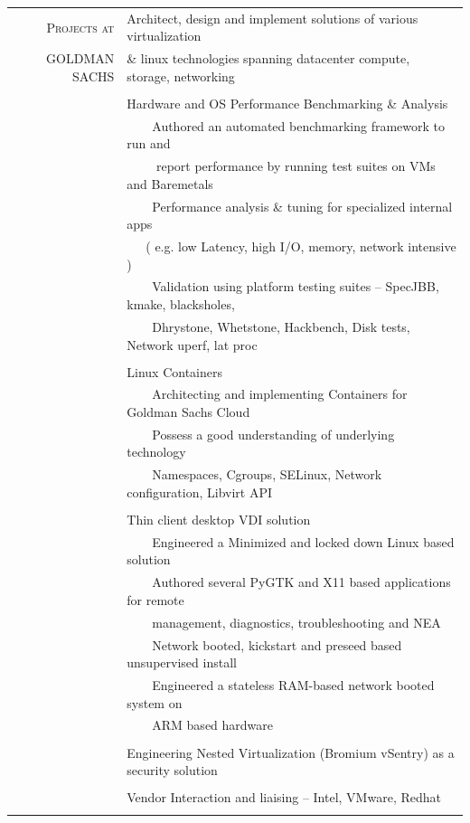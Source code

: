 \documentclass[a4paper,10pt]{article} %
\newcommand{\tabitem}{~~\llap{\textbullet}~~}
\begin{document}
\begin{tabular}{rp{12cm}}
	\textsc{Projects at}  &  Architect, design and implement solutions of various virtualization \\
	\textsc{GOLDMAN SACHS} &   \& linux technologies spanning datacenter compute, storage, networking \\
	&\\
	& Hardware and OS Performance Benchmarking \& Analysis\\
	& \tabitem Authored an automated benchmarking framework to run and \\
	& ~~~~ report performance by running test suites on VMs and Baremetals\\
	& \tabitem Performance analysis \& tuning for specialized internal apps \\
	& ~~~( e.g. low Latency, high I/O, memory, network intensive )\\
	& \tabitem Validation using platform testing suites – SpecJBB, kmake, blacksholes, \\
	& ~~~~Dhrystone, Whetstone, Hackbench, Disk tests, Network uperf, lat proc \\
	&\\
	& Linux Containers\\
	& \tabitem Architecting and implementing Containers for Goldman Sachs Cloud \\
	& \tabitem Possess a good understanding of underlying technology \\
	& ~~~~Namespaces, Cgroups, SELinux, Network configuration, Libvirt API \\
	&\\
	& Thin client desktop VDI solution\\
	& \tabitem Engineered a Minimized and locked down Linux based solution \\
	& \tabitem Authored several PyGTK and X11 based applications for remote \\
	& ~~~~management, diagnostics, troubleshooting and NEA \\
	& \tabitem Network booted, kickstart and preseed based unsupervised install \\
	& \tabitem Engineered a stateless RAM-based network booted system on\\ & ~~~~ARM based hardware\\
	&\\
	& Engineering Nested Virtualization (Bromium vSentry) as a security solution\\
	& \\
	& Vendor Interaction and liaising – Intel, VMware, Redhat \\
	&\\
\end{tabular}
\end{document}
